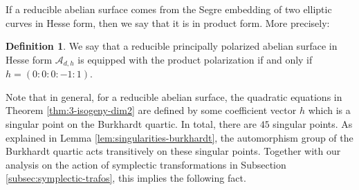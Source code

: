 \documentclass[11pt]{amsart}
\newtheorem{lemma}[theorem]{Lemma}
\theoremstyle{definition}
\newtheorem{definition}[theorem]{Definition}
\newcommand{\A}{\mathcal{A}}
\newcommand{\PP}{\mathbb{P}}
\begin{document}

 

If a reducible abelian surface comes from the Segre embedding of two elliptic curves in Hesse form, then we say that it is in product form. More precisely:

\begin{definition} \label{def:product-structure}
    We say that a reducible principally polarized abelian surface in Hesse form $\A_{d,h}$ is equipped with the product polarization if and only if $h = (0:0:0:-1:1)$.
\end{definition}

Note that in general, for a reducible abelian surface, the quadratic equations in Theorem \ref{thm:3-isogeny-dim2} are defined by some coefficient vector $h$ which is a singular point on the Burkhardt quartic. In total, there are $45$ singular points. As explained in Lemma \ref{lem:singularities-burkhardt}, the automorphism group of the Burkhardt quartic acts transitively on these singular points. Together with our analysis on the action of symplectic transformations in Subsection \ref{subsec:symplectic-trafos}, this implies the following fact.
\end{document}
